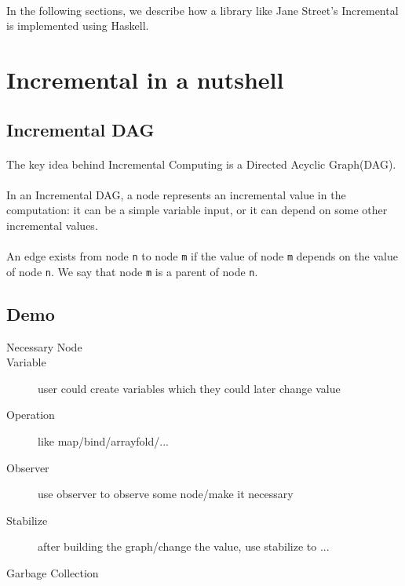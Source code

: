 \documentclass[a4paper, twocolumn]{article}
\begin{document}
\paragraph{} In the following sections, we describe how a library like Jane Street's Incremental is implemented using Haskell.

\section{Incremental in a nutshell }

\subsection{Incremental DAG}
\paragraph{} The key idea behind Incremental Computing is a Directed Acyclic Graph(DAG). 

\paragraph{} In an Incremental DAG, a node represents an incremental value in the computation: it can be a simple variable input, or it can depend on some other incremental values. 

\paragraph{} An edge exists from node \verb|n| to node \verb|m| if the value of node \verb|m| depends on the value of node \verb|n|. We say that node \verb|m| is a parent of node \verb|n|.



\subsection{Demo}
\begin{description}
  \item [Necessary Node]
  \item [Variable] user could create variables which they could later change value 
  \item [Operation] like map/bind/arrayfold/...
  \item [Observer] use observer to observe some node/make it necessary
  \item [Stabilize] after building the graph/change the value, use stabilize to ...
  \item [Garbage Collection] 
\end{description}
 
\end{document}
